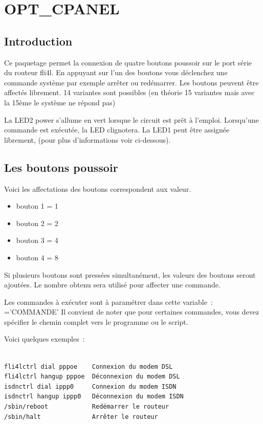 {
\section {OPT\_CPANEL}
}

\subsection{Introduction}

Ce paquetage permet la connexion de quatre boutons poussoir sur le port série
du routeur fli4l. En appuyant sur l'un des boutons vous déclenchez une commande
système par exemple arrêter ou redémarrer. Les boutons peuvent être affectés
librement. 14 variantes sont possibles (en théorie 15 variantes mais avec la
15ème le système ne répond pas)

La LED2 power s'allume en vert lorsque le circuit est prêt à l'emploi.
Lorsqu'une commande est exécutée, la LED clignotera. La LED1 peut être
assignée librement, (pour plus d'informations voir ci-dessous).

\subsection{Les boutons poussoir}

Voici les affectations des boutons correspondent aux valeur.

\begin{itemize}
    \item bouton 1 = 1
    \item bouton 2 = 2
    \item bouton 3 = 4
    \item bouton 4 = 8
\end{itemize}

Si plusieurs boutons sont pressées simultanément, les valeurs des boutons seront
ajoutées. Le nombre obtenu sera utilisé pour affecter une commande.

Les commandes à exécuter sont à paramétrer dans cette variable~:
='COMMANDE'
Il convient de noter que pour certaines commandes, vous devez spécifier le
chemin complet vers le programme ou le script.

Voici quelques exemples~:
\begin{verbatim}

fli4lctrl dial pppoe    Connexion du modem DSL
fli4lctrl hangup pppoe  Déconnexion du modem DSL
isdnctrl dial ippp0     Connexion du modem ISDN
isdnctrl hangup ippp0   Déconnexion du modem ISDN
/sbin/reboot            Redémarrer le routeur
/sbin/halt              Arrêter le routeur

\end{verbatim}

